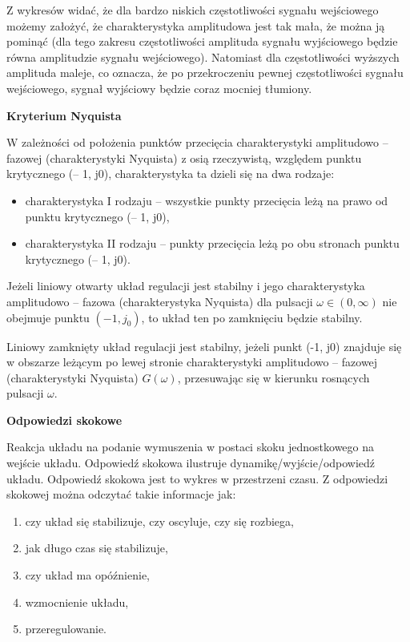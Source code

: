 Z wykresów widać, że dla bardzo niskich częstotliwości sygnału wejściowego możemy założyć, że charakterystyka amplitudowa jest tak mała, że można ją pominąć (dla tego zakresu częstotliwości amplituda sygnału wyjściowego będzie równa amplitudzie sygnału wejściowego). Natomiast dla częstotliwości wyższych amplituda maleje, co oznacza, że po przekroczeniu pewnej częstotliwości sygnału wejściowego, sygnał wyjściowy będzie coraz mocniej tłumiony.


\textbf{Kryterium Nyquista}

W zależności od położenia punktów przecięcia charakterystyki amplitudowo – fazowej (charakterystyki Nyquista) z osią rzeczywistą, względem punktu krytycznego (– 1, j0), charakterystyka ta dzieli się na dwa rodzaje:
\begin{itemize}
    \item charakterystyka I rodzaju – wszystkie punkty przecięcia leżą na prawo od punktu krytycznego (– 1, j0),
    \item charakterystyka II rodzaju – punkty przecięcia leżą po obu stronach punktu krytycznego (– 1, j0). 
\end{itemize}

Jeżeli liniowy otwarty układ regulacji jest stabilny i jego charakterystyka amplitudowo – fazowa (charakterystyka Nyquista) dla pulsacji  $\omega\in (0, \infty)$ nie obejmuje punktu $(-1,j_0)$, to układ ten po zamknięciu będzie stabilny. 

Liniowy zamknięty układ regulacji jest stabilny, jeżeli punkt (-1, j0) znajduje się w obszarze leżącym po lewej stronie charakterystyki amplitudowo – fazowej (charakterystyki Nyquista)  $G(\omega)$, przesuwając się w kierunku rosnących pulsacji $\omega$. 

\textbf{Odpowiedzi skokowe}

Reakcja układu na podanie wymuszenia w postaci skoku jednostkowego na wejście układu.
Odpowiedź skokowa ilustruje dynamikę/wyjście/odpowiedź układu. Odpowiedź skokowa
jest to wykres w przestrzeni czasu. Z odpowiedzi skokowej można odczytać takie informacje
jak:
\begin{enumerate}
    \item czy układ się stabilizuje, czy oscyluje, czy się rozbiega,
    \item jak długo czas się stabilizuje,
    \item czy układ ma opóźnienie,
    \item wzmocnienie układu,
    \item przeregulowanie.
\end{enumerate}

